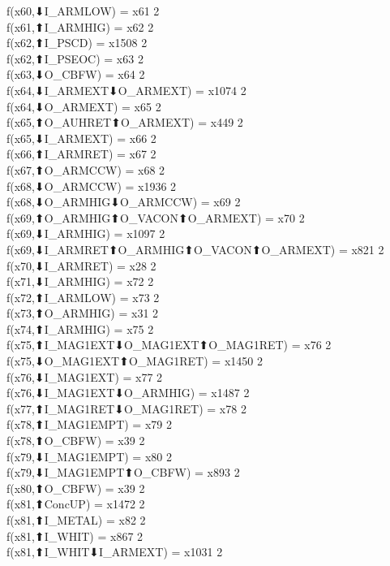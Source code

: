 f(x60,⬇I_ARMLOW) = x61 {2} \\
f(x61,⬆I_ARMHIG) = x62 {2} \\
f(x62,⬆I_PSCD) = x1508 {2} \\
f(x62,⬆I_PSEOC) = x63 {2} \\
f(x63,⬇O_CBFW) = x64 {2} \\
f(x64,⬇I_ARMEXT⬇O_ARMEXT) = x1074 {2} \\
f(x64,⬇O_ARMEXT) = x65 {2} \\
f(x65,⬆O_AUHRET⬆O_ARMEXT) = x449 {2} \\
f(x65,⬇I_ARMEXT) = x66 {2} \\
f(x66,⬆I_ARMRET) = x67 {2} \\
f(x67,⬆O_ARMCCW) = x68 {2} \\
f(x68,⬇O_ARMCCW) = x1936 {2} \\
f(x68,⬇O_ARMHIG⬇O_ARMCCW) = x69 {2} \\
f(x69,⬆O_ARMHIG⬆O_VACON⬆O_ARMEXT) = x70 {2} \\
f(x69,⬇I_ARMHIG) = x1097 {2} \\
f(x69,⬇I_ARMRET⬆O_ARMHIG⬆O_VACON⬆O_ARMEXT) = x821 {2} \\
f(x70,⬇I_ARMRET) = x28 {2} \\
f(x71,⬇I_ARMHIG) = x72 {2} \\
f(x72,⬆I_ARMLOW) = x73 {2} \\
f(x73,⬆O_ARMHIG) = x31 {2} \\
f(x74,⬆I_ARMHIG) = x75 {2} \\
f(x75,⬆I_MAG1EXT⬇O_MAG1EXT⬆O_MAG1RET) = x76 {2} \\
f(x75,⬇O_MAG1EXT⬆O_MAG1RET) = x1450 {2} \\
f(x76,⬇I_MAG1EXT) = x77 {2} \\
f(x76,⬇I_MAG1EXT⬇O_ARMHIG) = x1487 {2} \\
f(x77,⬆I_MAG1RET⬇O_MAG1RET) = x78 {2} \\
f(x78,⬆I_MAG1EMPT) = x79 {2} \\
f(x78,⬆O_CBFW) = x39 {2} \\
f(x79,⬇I_MAG1EMPT) = x80 {2} \\
f(x79,⬇I_MAG1EMPT⬆O_CBFW) = x893 {2} \\
f(x80,⬆O_CBFW) = x39 {2} \\
f(x81,⬆ConcUP) = x1472 {2} \\
f(x81,⬆I_METAL) = x82 {2} \\
f(x81,⬆I_WHIT) = x867 {2} \\
f(x81,⬆I_WHIT⬇I_ARMEXT) = x1031 {2} \\
